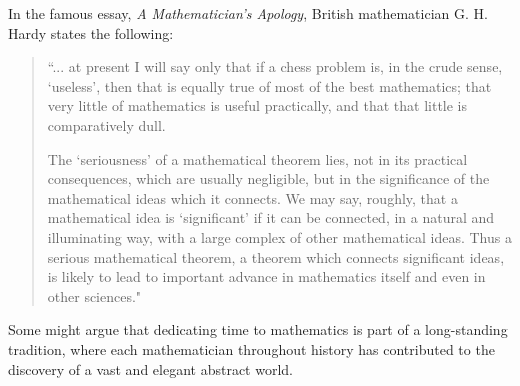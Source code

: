 \documentclass[10pt,twocolumn]{article}
\begin{document}
\begin{sloppy}
In the famous essay, \textit{A Mathematician's Apology}, British mathematician G. H. Hardy states the following:
\begin{quote}
``... at present I will say only that if a chess problem is, in the crude sense, ‘useless’, then that is equally true of most of the best mathematics; that very little of mathematics is useful practically, and that that little is comparatively dull.

The ‘seriousness’ of a mathematical theorem lies, not in its practical consequences, which are usually negligible, but in the significance of the mathematical ideas which it connects. We may say, roughly, that a mathematical idea is ‘significant’ if it can be connected, in a natural and illuminating way, with a large complex of other mathematical ideas. Thus a serious mathematical theorem, a theorem which connects significant ideas, is likely to lead to important advance in mathematics itself and even in other sciences."
\end{quote}

Some might argue that dedicating time to mathematics is part of a long-standing tradition, where each mathematician throughout history has contributed to the discovery of a vast and elegant abstract world.




    \printbibliography
\end{sloppy}
\end{document}
